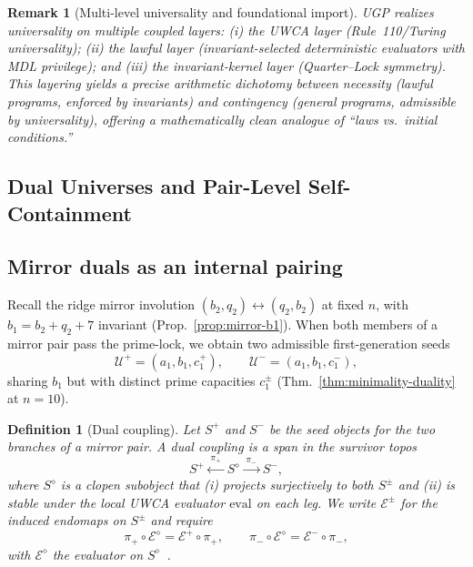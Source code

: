\documentclass[12pt]{article}
\newtheorem{definition}[theorem]{Definition}
\newtheorem{remark}[theorem]{Remark}
\numberwithin{equation}{section}
\begin{document}
\begin{remark}[Multi-level universality and foundational import]\label{rem:multi-level}
UGP realizes universality on multiple coupled layers: (i) the UWCA layer (Rule~110/Turing universality); (ii) the lawful layer (invariant-selected deterministic evaluators with MDL privilege); and (iii) the invariant-kernel layer (Quarter--Lock symmetry). This layering yields a precise arithmetic dichotomy between \emph{necessity} (lawful programs, enforced by invariants) and \emph{contingency} (general programs, admissible by universality), offering a mathematically clean analogue of ``laws vs.\ initial conditions.''
\end{remark}

\subsection{Dual Universes and Pair-Level Self-Containment}\label{sec:dual-psc}

\subsection{Mirror duals as an internal pairing}
Recall the ridge mirror involution $(b_2,q_2)\leftrightarrow(q_2,b_2)$ at fixed $n$, with $b_1=b_2+q_2+7$ invariant (Prop.~\ref{prop:mirror-b1}). When both members of a mirror pair pass the prime-lock, we obtain two admissible first-generation seeds
\[
\mathcal{U}^+=(a_1,b_1,c_1^+),\qquad \mathcal{U}^-=(a_1,b_1,c_1^-),
\]
sharing $b_1$ but with distinct prime capacities $c_1^\pm$ (Thm.~\ref{thm:minimality-duality} at $n=10$).

\begin{definition}[Dual coupling]\label{def:dual-coupling}
Let $S^+$ and $S^-$ be the seed objects for the two branches of a mirror pair. A \emph{dual coupling} is a span in the survivor topos
\[
S^+ \xleftarrow{\;\pi_+\;} S^\diamond \xrightarrow{\;\pi_-\;} S^-,
\]
where $S^\diamond$ is a clopen subobject that (i) projects surjectively to both $S^\pm$ and (ii) is stable under the local UWCA evaluator $\mathrm{eval}$ on each leg. We write $\mathscr{E}^\pm$ for the induced endomaps on $S^\pm$ and require
\[
\pi_+\circ \mathscr{E}^\diamond = \mathscr{E}^+\circ \pi_+,\qquad
\pi_-\circ \mathscr{E}^\diamond = \mathscr{E}^-\circ \pi_-,
\]
with $\mathscr{E}^\diamond$ the evaluator on $S^\diamond$~\cite{SpivackUGPFormalization,ugp-lean}.
\end{definition}
\end{document}
